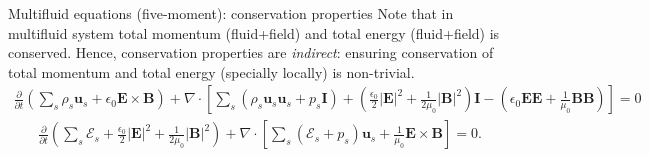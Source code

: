 \documentclass[aspectratio=169]{beamer}
\newcommand{\pfraca}[1]{\frac{\partial}{\partial #1}}
\newcommand{\mvec}[1]{\mathbf{#1}}
\begin{document}
\begin{frame}{Multifluid equations (five-moment): conservation
    properties}
  Note that in multifluid system total momentum (fluid+field) and
  total energy (fluid+field) is conserved. Hence, conservation
  properties are \emph{indirect}: ensuring conservation of total
  momentum and total energy (specially locally) is non-trivial.
  \footnotesize
  \begin{align*}
    \pfraca{t}
    \left(
    \sum_s \rho_s\mvec{u}_s + \epsilon_0 \mvec{E}\times\mvec{B}
    \right)
    + \nabla\cdot
    \left[
    \sum_s (\rho_s\mvec{u}_s\mvec{u}_s + p_s\mvec{I})
    +
    \left(
    \frac{\epsilon_{0}}{2}|\mathbf{E}|^{2}+\frac{1}{2
    \mu_{0}}|\mathbf{B}|^{2}
    \right)\mvec{I}
    -
    \left(
    \epsilon_{0} \mathbf{E E}+\frac{1}{\mu_{0}} \mathbf{B B}
    \right)
    \right]
    = 0
  \end{align*}
  \begin{align*}
    \pfraca{t}
    \left(
    \sum_s \mathcal{E}_s + \frac{\epsilon_{0}}{2}|\mathbf{E}|^{2}+\frac{1}{2 \mu_{0}}|\mathbf{B}|^{2}
    \right)
    + \nabla\cdot\left[
    \sum_s (\mathcal{E}_s+p_s)\mvec{u}_s
    +
    \frac{1}{\mu_0} \mvec{E}\times\mvec{B}
    \right]
    = 0.
  \end{align*}    
\end{frame}  
\end{document}
